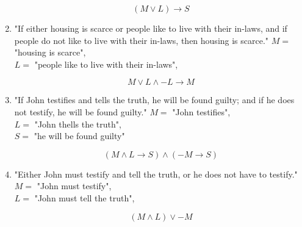\documentclass{article}
\begin{document}
\begin{enumerate}[label=(\alph*)]
\[(M \lor L) \rightarrow S\]

    \item "If either housing is scarce or people like to live with their in-laws, and if people do not like to live with their in-laws, then housing is scarce."
\singlespace
    \(M =\) "housing is scarce",\\
    \(L = \) "people like to live with their in-laws",\\
\singlespace

\[M \lor L \land -L \rightarrow M\]


    \item "If John testifies and tells the truth, he will be found guilty; and if he does not testify, he will be found guilty."
\singlespace
    \(M =\) "John testifies",\\
    \(L = \) "John thells the truth",\\
    \(S = \) "he will be found guilty"
\singlespace

\[(M \land L \rightarrow S) \land (-M \rightarrow S)\]

    \item "Either John must testify and tell the truth, or he does not have to testify."
\singlespace
    \(M =\) "John must testify",\\
    \(L = \) "John must tell the truth",\\
\singlespace

\[(M \land L) \lor -M\]
\end{enumerate}
\end{document}

